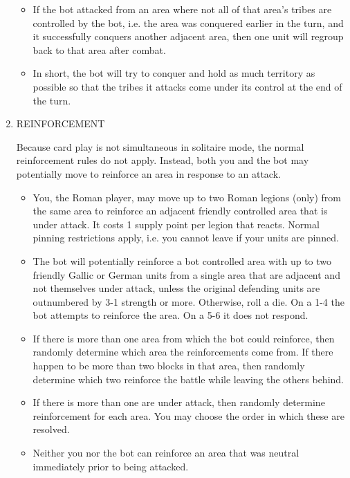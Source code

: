 \begin{enumerate}
\begin{itemize}
    \item If the bot attacked from an area where not all of that area's tribes are controlled by the bot, i.e. the area was conquered earlier in the turn, and it successfully conquers another adjacent area, then one unit will regroup back to that area after combat.
    
    \item In short, the bot will try to conquer and hold as much territory as possible so that the tribes it attacks come under its control at the end of the turn.
  \end{itemize}
  
  \item REINFORCEMENT
  
  Because card play is not simultaneous in solitaire mode, the normal reinforcement rules do not apply. Instead, both you and the bot may potentially move to reinforce an area in response to an attack.
  
  \begin{itemize}
    \item You, the Roman player, may move up to two Roman legions (only) from the same area to reinforce an adjacent friendly controlled area that is under attack. It costs 1 supply point per legion that reacts. Normal pinning restrictions apply, i.e. you cannot leave if your units are pinned.
    
    \item The bot will potentially reinforce a bot controlled area with up to two friendly Gallic or German units from a single area that are adjacent and not themselves under attack, unless the original defending units are outnumbered by 3-1 strength or more. Otherwise, roll a die. On a 1-4 the bot attempts to reinforce the area. On a 5-6 it does not respond.
    
    \item If there is more than one area from which the bot could reinforce, then randomly determine which area the reinforcements come from. If there happen to be more than two blocks in that area, then randomly determine which two reinforce the battle while leaving the others behind.
    
    \item If there is more than one are under attack, then randomly determine reinforcement for each area. You may choose the order in which these are resolved. 
    
    \item Neither you nor the bot can reinforce an area that was neutral immediately prior to being attacked.
  \end{itemize}
  

\end{enumerate}

